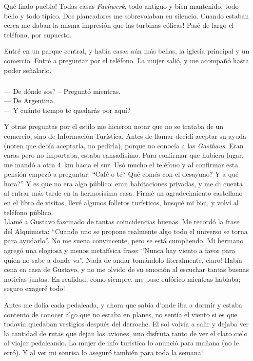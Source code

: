 \textexclamdown Qu\'e lindo pueblo! Todas casas \emph{Fachwerk}, todo antiguo
y bien mantenido, todo bello y todo t\'ipico. Dos planeadores me sobrevolaban
en silencio. \textexclamdown Cuando estaban cerca me daban la misma impresi\'on
que las turbinas e\'olicas! Pas\'e de largo el tel\'efono, por supuesto.

Entr\'e en un parque central, y hab\'ia casas a\'un m\'as bellas, la iglesia
principal y un comercio. Entr\'e a preguntar por el tel\'efono. La mujer
sali\'o, y me acompa\~n\'o hasta poder se\~nalarlo.

\subparagraph{}\label{ssub:oficinaDeTurismo} --- \textquestiondown De d\'onde
sos? -- Pregunt\'o mientras.\\ --- De Argentina.\\ --- \textquestiondown Y
cu\'anto tiempo te quedar\'as por aqu\'i?\\ \hangindent=1cm

Y otras preguntas por el estilo me hicieron notar que no se trataba de un
comercio, sino de Informaci\'on Tur\'istica. Antes de llamar decid\'i
aceptar su ayuda (noten que deb\'ia aceptarla, no pedirla), porque no
conoc\'ia a las \emph{Gasthaus}. Eran caras pero no importaba, estaba
cansad\'isimo. Para confirmar que hubiera lugar, me mand\'o a otra 4~km hacia
el sur. Us\'o mucho el tel\'efono y al confirmar esta pensi\'on empez\'o a
preguntar: ``\textquestiondown Caf\'e o t\'e? \textquestiondown Qu\'e com\'es
con el desayuno? \textquestiondown Y a qu\'e hora?'' Y es que no era algo
p\'ublico: eran habitaciones privadas, y me di cuenta al entrar m\'as tarde en
la hermos\'isima casa. Firm\'e un agradecimiento castellano en el libro de
visitas, llev\'e algunos folletos tur\'isticos, busqu\'e mi bici, y volv\'i al
tel\'efono p\'ublico.\\

Llam\'e a Gustavo fascinado de tantas coincidencias buenas. Me record\'o
la frase del Alquimista: ``Cuando uno se propone realmente algo todo el
universo se torna para ayudarlo''. No me suena convincente, pero se est\'a
cumpliendo. Mi hermano agreg\'o una elogiosa y menos metaf\'isica frase:
``Nunca hay viento a favor para quien no sabe a donde va''. \textexclamdown
Nada de andar tom\'andolo literalmente, claro! Hab\'ia cena en casa de Gustavo,
y no me olvido de su emoci\'on al escuchar tantas buenas noticias juntas. En
realidad, como siempre, me puse euf\'orico mientras hablaba; \textexclamdown
seguro exager\'e todo!

Antes me dol\'ia cada pedaleada, y ahora que sab\'ia d'onde iba a dormir y
estaba contento de conocer algo que no estaba en planes, no sent\'ia el viento
si es que todav\'ia quedaban vestigios despu\'es del derroche. El sol volv\'ia a
salir y dejaba ver la cantidad de rutas que dejan los aviones, uno disfruta
tanto de ver el claro cielo al viajar pedaleando. La mujer de info tur\'istica
lo anunci\'o para ma\~nana (no le err\'o). \textexclamdown Y al ver mi sonrisa
lo asegur\'o tambi\'en para toda la semana!

